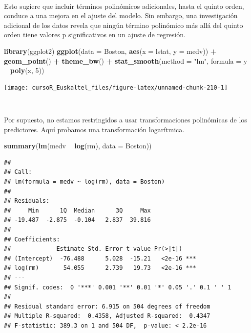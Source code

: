 \documentclass[]{book}
\newenvironment{Shaded}{\begin{snugshade}}{\end{snugshade}}
\newcommand{\KeywordTok}[1]{\textcolor[rgb]{0.13,0.29,0.53}{\textbf{#1}}}
\newcommand{\DataTypeTok}[1]{\textcolor[rgb]{0.13,0.29,0.53}{#1}}
\newcommand{\DecValTok}[1]{\textcolor[rgb]{0.00,0.00,0.81}{#1}}
\newcommand{\StringTok}[1]{\textcolor[rgb]{0.31,0.60,0.02}{#1}}
\newcommand{\OperatorTok}[1]{\textcolor[rgb]{0.81,0.36,0.00}{\textbf{#1}}}
\newcommand{\NormalTok}[1]{#1}
\begin{document}
~

Esto sugiere que incluir términos polinómicos adicionales, hasta el
quinto orden, conduce a una mejora en el ajuste del modelo. Sin embargo,
una investigación adicional de los datos revela que ningún término
polinómico más allá del quinto orden tiene valores p significativos en
un ajuste de regresión.

\begin{Shaded}
\begin{Highlighting}[]
\KeywordTok{library}\NormalTok{(ggplot2)}
\KeywordTok{ggplot}\NormalTok{(}\DataTypeTok{data =}\NormalTok{ Boston, }\KeywordTok{aes}\NormalTok{(}\DataTypeTok{x =}\NormalTok{ lstat, }\DataTypeTok{y =}\NormalTok{ medv)) }\OperatorTok{+}\StringTok{ }
\StringTok{  }\KeywordTok{geom_point}\NormalTok{() }\OperatorTok{+}\StringTok{ }
\StringTok{  }\KeywordTok{theme_bw}\NormalTok{() }\OperatorTok{+}\StringTok{ }
\StringTok{  }\KeywordTok{stat_smooth}\NormalTok{(}\DataTypeTok{method =} \StringTok{"lm"}\NormalTok{, }\DataTypeTok{formula =}\NormalTok{ y }\OperatorTok{~}\StringTok{ }\KeywordTok{poly}\NormalTok{(x, }\DecValTok{5}\NormalTok{))}
\end{Highlighting}
\end{Shaded}

\begin{center}\texttt{[image: cursoR\_Euskaltel\_files/figure-latex/unnamed-chunk-210-1]} \end{center}

~

Por supuesto, no estamos restringidos a usar transformaciones
polinómicas de los predictores. Aquí probamos una transformación
logarítmica.

\begin{Shaded}
\begin{Highlighting}[]
\KeywordTok{summary}\NormalTok{(}\KeywordTok{lm}\NormalTok{(medv }\OperatorTok{~}\StringTok{ }\KeywordTok{log}\NormalTok{(rm), }\DataTypeTok{data =}\NormalTok{ Boston))}
\end{Highlighting}
\end{Shaded}

\begin{verbatim}
## 
## Call:
## lm(formula = medv ~ log(rm), data = Boston)
## 
## Residuals:
##     Min      1Q  Median      3Q     Max 
## -19.487  -2.875  -0.104   2.837  39.816 
## 
## Coefficients:
##             Estimate Std. Error t value Pr(>|t|)    
## (Intercept)  -76.488      5.028  -15.21   <2e-16 ***
## log(rm)       54.055      2.739   19.73   <2e-16 ***
## ---
## Signif. codes:  0 '***' 0.001 '**' 0.01 '*' 0.05 '.' 0.1 ' ' 1
## 
## Residual standard error: 6.915 on 504 degrees of freedom
## Multiple R-squared:  0.4358, Adjusted R-squared:  0.4347 
## F-statistic: 389.3 on 1 and 504 DF,  p-value: < 2.2e-16
\end{verbatim}
\end{document}
